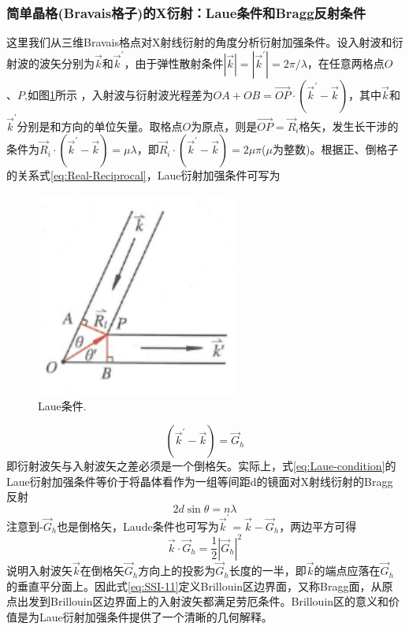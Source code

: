 \subsubsection{简单晶格(Bravais格子)的X衍射：Laue条件和Bragg反射条件} 
这里我们从三维Bravais格点对X射线衍射的角度分析衍射加强条件。设入射波和衍射波的波矢分别为$\vec k$和$\vec k^{\prime}$，由于弹性散射条件$|\vec k|=|\vec k^{\prime}|=2\pi/\lambda$，在任意两格点$O$、$P$,如图\ref{Fig:Laue_condition}所示 ，入射波与衍射波光程差为$OA+OB=\vec{OP}\cdot(\vec k^{\prime}-\vec k)$，其中$\vec k$和$\vec k^{\prime}$分别是和方向的单位矢量。取格点$O$为原点，则是$\vec{OP}=\vec R_i$格矢，发生长干涉的条件为$\vec R_i\cdot(\vec k^{\prime}-\vec k)=\mu\lambda$，即$\vec R_i\cdot(\vec k^{\prime}-\vec k)=2\mu\pi$($\mu$为整数)。根据正、倒格子的关系式\eqref{eq:Real-Reciprocal}，Laue衍射加强条件可写为
\begin{figure}[h!]
\centering
\vspace*{-0.05in}
\includegraphics[height=2.65in,width=2.65in,viewport=0 0 40 40,clip]{Figures/Laue_condition.png}
\caption{\small \textrm{Laue条件.}}%
\label{Fig:Laue_condition}
\end{figure}
\begin{equation}
	(\vec k^{\prime}-\vec k)=\vec G_h
	\label{eq:Laue-condition}
\end{equation} 
即衍射波矢与入射波矢之差必须是一个倒格矢。实际上，式\eqref{eq:Laue-condition}的Laue衍射加强条件等价于将晶体看作为一组等间距d的镜面对X射线衍射的Bragg反射%
\begin{equation}
	2d\sin\theta=n\lambda
	\label{eq:Bragg-condition}
\end{equation}
注意到-$\vec G_h$也是倒格矢，Laude条件也可写为$\vec k^{\prime}=\vec k-\vec G_h$，两边平方可得
\begin{equation}
	\vec k\cdot\vec G_h=\dfrac12|\vec G_h|^2
	\label{eq:SSI-11}
\end{equation} 
说明入射波矢$\vec k$在倒格矢$\vec G_h$方向上的投影为$\vec G_h$长度的一半，即$\vec k$的端点应落在$\vec G_h$的垂直平分面上。因此式\eqref{eq:SSI-11}定义Brillouin区边界面，又称Bragg面，从原点出发到Brillouin区边界面上的入射波矢都满足劳厄条件。Brillouin区的意义和价值是为Laue衍射加强条件提供了一个清晰的几何解释。

